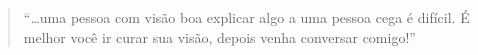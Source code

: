 

\cleartoverso

\begin{quote}
“…uma pessoa com visão boa explicar algo a uma pessoa cega é difícil. É
melhor você ir curar sua visão, depois venha conversar comigo!”
\end{quote}

